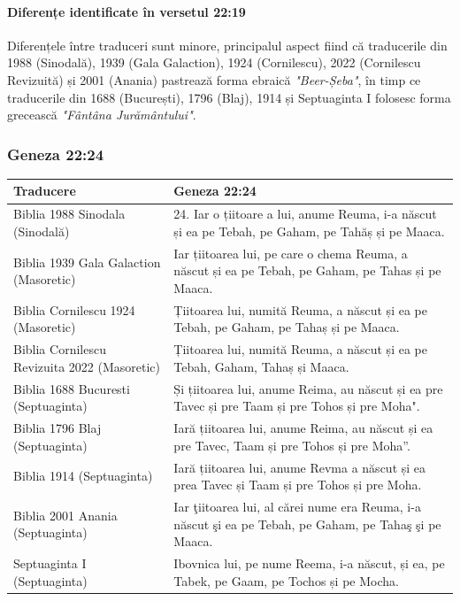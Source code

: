 \documentclass[12pt,a4paper]{article}
\begin{document}
\paragraph{Diferențe identificate în versetul 22:19}
Diferențele între traduceri sunt minore, principalul aspect fiind că traducerile din
1988 (Sinodală), 1939 (Gala Galaction), 1924 (Cornilescu), 2022 (Cornilescu Revizuită) și 2001 (Anania) pastrează forma ebraică \emph{"Beer-Șeba"}, în timp ce traducerile din 1688 (București), 1796 (Blaj), 1914 și Septuaginta I folosesc forma grecească \emph{"Fântâna Jurământului"}.

\subsubsection{Geneza 22:24}

\begin{longtable}{|p{3cm}|L|}
    \hline
    \textbf{Traducere}                           & \textbf{Geneza 22:24}                                                                                  \\
    \hline
    Biblia 1988 Sinodala (Sinodală)              & 24. Iar o țiitoare a lui, anume Reuma, i-a născut și ea pe Tebah, pe Gaham, pe Tahăș și pe Maaca.      \\
    \hline
    Biblia 1939 Gala Galaction (Masoretic)       & Iar țiitoarea lui, pe care o chema Reuma, a născut și ea pe Tebah, pe Gaham, pe Tahas și pe Maaca.     \\
    \hline
    Biblia Cornilescu 1924 (Masoretic)           & Țiitoarea lui, numită Reuma, a născut și ea pe Tebah, pe Gaham, pe Tahaș și pe Maaca.                  \\
    \hline
    Biblia Cornilescu Revizuita 2022 (Masoretic) & Țiitoarea lui, numită Reuma, a născut și ea pe Tebah, Gaham, Tahaș și Maaca.                           \\
    \hline
    Biblia 1688 Bucuresti (Septuaginta)          & Și țiitoarea lui, anume Reima, au născut și ea pre Tavec și pre Taam și pre Tohos și pre Moha".        \\
    \hline
    Biblia 1796 Blaj (Septuaginta)               & Iară țiitoarea lui, anume Reima, au născut și ea pre Tavec, Taam și pre Tohos și pre Moha”.            \\
    \hline
    Biblia 1914 (Septuaginta)                    & Iară țiitoarea lui, anume Revma a născut și ea prea Tavec și Taam și pre Tohos și pre Moha.            \\
    \hline
    Biblia 2001 Anania (Septuaginta)             & Iar ţiitoarea lui, al cărei nume era Reuma, i-a născut şi ea pe Tebah, pe Gaham, pe Tahaş şi pe Maaca. \\
    \hline
    Septuaginta I (Septuaginta)                  & Ibovnica lui, pe nume Reema, i-a născut, și ea, pe Tabek, pe Gaam, pe Tochos și pe Mocha.              \\
    \hline
\end{longtable}
\end{document}
